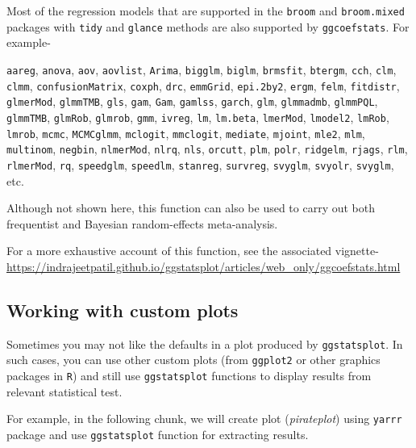 \documentclass[
]{article}
\begin{document}
Most of the regression models that are supported in the \texttt{broom} and
\texttt{broom.mixed} packages with \texttt{tidy} and \texttt{glance} methods are also supported by
\texttt{ggcoefstats}. For example-

\texttt{aareg}, \texttt{anova}, \texttt{aov}, \texttt{aovlist}, \texttt{Arima}, \texttt{bigglm}, \texttt{biglm}, \texttt{brmsfit},
\texttt{btergm}, \texttt{cch}, \texttt{clm}, \texttt{clmm}, \texttt{confusionMatrix}, \texttt{coxph}, \texttt{drc}, \texttt{emmGrid},
\texttt{epi.2by2}, \texttt{ergm}, \texttt{felm}, \texttt{fitdistr}, \texttt{glmerMod}, \texttt{glmmTMB}, \texttt{gls}, \texttt{gam},
\texttt{Gam}, \texttt{gamlss}, \texttt{garch}, \texttt{glm}, \texttt{glmmadmb}, \texttt{glmmPQL}, \texttt{glmmTMB}, \texttt{glmRob},
\texttt{glmrob}, \texttt{gmm}, \texttt{ivreg}, \texttt{lm}, \texttt{lm.beta}, \texttt{lmerMod}, \texttt{lmodel2}, \texttt{lmRob},
\texttt{lmrob}, \texttt{mcmc}, \texttt{MCMCglmm}, \texttt{mclogit}, \texttt{mmclogit}, \texttt{mediate}, \texttt{mjoint}, \texttt{mle2},
\texttt{mlm}, \texttt{multinom}, \texttt{negbin}, \texttt{nlmerMod}, \texttt{nlrq}, \texttt{nls}, \texttt{orcutt}, \texttt{plm}, \texttt{polr},
\texttt{ridgelm}, \texttt{rjags}, \texttt{rlm}, \texttt{rlmerMod}, \texttt{rq}, \texttt{speedglm}, \texttt{speedlm}, \texttt{stanreg},
\texttt{survreg}, \texttt{svyglm}, \texttt{svyolr}, \texttt{svyglm}, etc.

Although not shown here, this function can also be used to carry out both
frequentist and Bayesian random-effects meta-analysis.

For a more exhaustive account of this function, see the associated vignette-
\url{https://indrajeetpatil.github.io/ggstatsplot/articles/web_only/ggcoefstats.html}

\hypertarget{working-with-custom-plots}{%
\subsection{Working with custom plots}\label{working-with-custom-plots}}

Sometimes you may not like the defaults in a plot produced by \texttt{ggstatsplot}. In
such cases, you can use other custom plots (from \texttt{ggplot2} or other graphics
packages in \texttt{R}) and still use \texttt{ggstatsplot} functions to display results from relevant
statistical test.

For example, in the following chunk, we will create plot (\emph{pirateplot}) using
\texttt{yarrr} package and use \texttt{ggstatsplot} function for extracting results.
\end{document}
